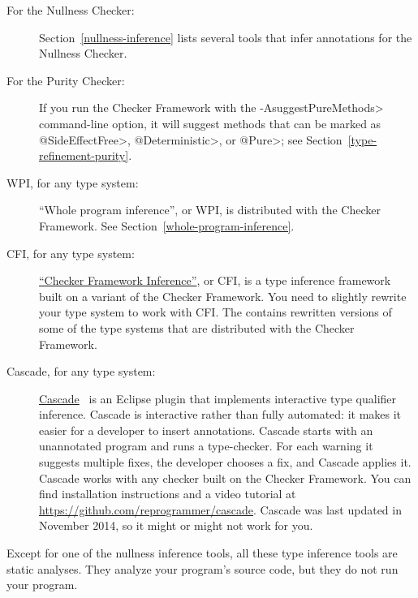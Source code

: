 \begin{description}
  \item[For the Nullness Checker:]
Section~\ref{nullness-inference} lists several tools that infer
annotations for the Nullness Checker.

\item[For the Purity Checker:]
If you run the Checker Framework with the \<-AsuggestPureMethods>
command-line option, it will suggest methods that can be marked as
\<@SideEffectFree>, \<@Deterministic>, or \<@Pure>; see
Section~\ref{type-refinement-purity}.

\item[WPI, for any type system:]
``Whole program inference'', or WPI, is distributed with the Checker
  Framework.  See Section~\ref{whole-program-inference}.

\item[CFI, for any type system:]
\href{https://github.com/opprop/checker-framework-inference}{``Checker
  Framework Inference''}, or CFI, is a type inference framework built on
a variant of the Checker Framework.  You need to slightly rewrite your type system to
work with CFI\@.  The
 contains rewritten versions of some of
the type systems that are distributed with the Checker Framework.

\item[Cascade, for any type system:]
\href{https://github.com/reprogrammer/cascade/}{Cascade}~\cite{VakilianPEJ2015}
is an Eclipse plugin that implements interactive type qualifier inference.
Cascade is interactive rather than fully automated:  it makes it easier for
a developer to insert annotations.
Cascade starts with an unannotated program and runs a type-checker.  For each
warning it suggests multiple fixes, the developer chooses a fix, and
Cascade applies it.  Cascade works with any checker built on the Checker
Framework.
You can find installation instructions and a video tutorial at \url{https://github.com/reprogrammer/cascade}.
Cascade was last updated in November 2014, so it might or might not work for you.

\end{description}

Except for one of the nullness inference tools, all these
type inference tools are static analyses.  They analyze your program's
source code, but they do not run your program.


